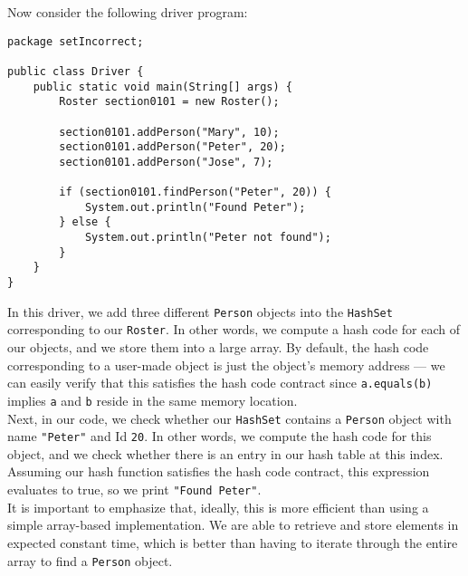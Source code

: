 Now consider the following driver program:

\begin{lstlisting}
package setIncorrect;

public class Driver {
	public static void main(String[] args) {
		Roster section0101 = new Roster();

		section0101.addPerson("Mary", 10);
		section0101.addPerson("Peter", 20);
		section0101.addPerson("Jose", 7);

		if (section0101.findPerson("Peter", 20)) {
			System.out.println("Found Peter");
		} else {
			System.out.println("Peter not found");
		}
	}
}
\end{lstlisting}

In this driver, we add three different \verb!Person! objects into the \verb!HashSet! corresponding to our \verb!Roster!. In other words, we compute a hash code for each of our objects, and we store them into a large array. By default, the hash code corresponding to a user-made object is just the object's memory address --- we can easily verify that this satisfies the hash code contract since \verb!a.equals(b)! implies \verb!a! and \verb!b! reside in the same memory location. \\ 

Next, in our code, we check whether our \verb!HashSet! contains a \verb!Person! object with name \verb!"Peter"! and Id \verb!20!. In other words, we compute the hash code for this object, and we check whether there is an entry in our hash table at this index. Assuming our hash function satisfies the hash code contract, this expression evaluates to true, so we print \verb!"Found Peter"!.  \\

It is important to emphasize that, ideally, this is more efficient than using a simple array-based implementation. We are able to retrieve and store elements in expected constant time, which is better than having to iterate through the entire array to find a \verb!Person! object. 

